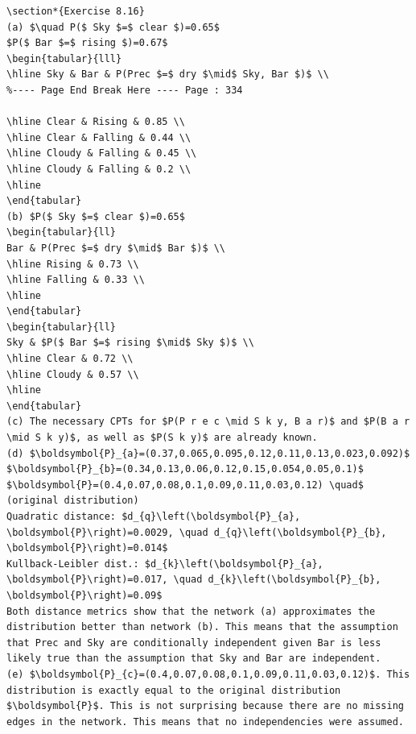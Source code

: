 \documentclass[10pt]{book}
\begin{document}
\begin{center}
\begin{enumerate}
\begin{center}
\begin{center}
\begin{center}
\begin{center}
\begin{center}
\begin{verbatim}
\section*{Exercise 8.16}
(a) $\quad P($ Sky $=$ clear $)=0.65$
$P($ Bar $=$ rising $)=0.67$
\begin{tabular}{lll}
\hline Sky & Bar & P(Prec $=$ dry $\mid$ Sky, Bar $)$ \\
%---- Page End Break Here ---- Page : 334

\hline Clear & Rising & 0.85 \\
\hline Clear & Falling & 0.44 \\
\hline Cloudy & Falling & 0.45 \\
\hline Cloudy & Falling & 0.2 \\
\hline
\end{tabular}
(b) $P($ Sky $=$ clear $)=0.65$
\begin{tabular}{ll} 
Bar & P(Prec $=$ dry $\mid$ Bar $)$ \\
\hline Rising & 0.73 \\
\hline Falling & 0.33 \\
\hline
\end{tabular}
\begin{tabular}{ll} 
Sky & $P($ Bar $=$ rising $\mid$ Sky $)$ \\
\hline Clear & 0.72 \\
\hline Cloudy & 0.57 \\
\hline
\end{tabular}
(c) The necessary CPTs for $P(P r e c \mid S k y, B a r)$ and $P(B a r \mid S k y)$, as well as $P(S k y)$ are already known.
(d) $\boldsymbol{P}_{a}=(0.37,0.065,0.095,0.12,0.11,0.13,0.023,0.092)$
$\boldsymbol{P}_{b}=(0.34,0.13,0.06,0.12,0.15,0.054,0.05,0.1)$
$\boldsymbol{P}=(0.4,0.07,0.08,0.1,0.09,0.11,0.03,0.12) \quad$ (original distribution)
Quadratic distance: $d_{q}\left(\boldsymbol{P}_{a}, \boldsymbol{P}\right)=0.0029, \quad d_{q}\left(\boldsymbol{P}_{b}, \boldsymbol{P}\right)=0.014$
Kullback-Leibler dist.: $d_{k}\left(\boldsymbol{P}_{a}, \boldsymbol{P}\right)=0.017, \quad d_{k}\left(\boldsymbol{P}_{b}, \boldsymbol{P}\right)=0.09$
Both distance metrics show that the network (a) approximates the distribution better than network (b). This means that the assumption that Prec and Sky are conditionally independent given Bar is less likely true than the assumption that Sky and Bar are independent.
(e) $\boldsymbol{P}_{c}=(0.4,0.07,0.08,0.1,0.09,0.11,0.03,0.12)$. This distribution is exactly equal to the original distribution $\boldsymbol{P}$. This is not surprising because there are no missing edges in the network. This means that no independencies were assumed.


\end{verbatim}
\end{center}
\end{center}
\end{center}
\end{center}
\end{center}
\end{enumerate}
\end{center}
\end{document}
